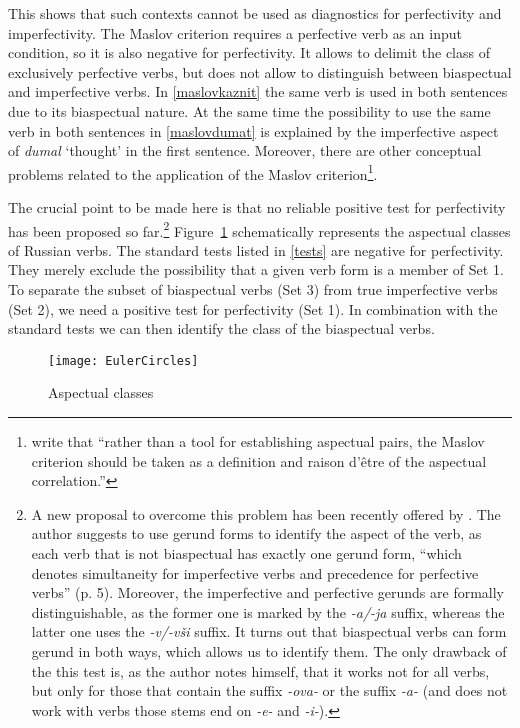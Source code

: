 This shows that such contexts cannot be used as diagnostics for perfectivity and imperfectivity. The Maslov criterion requires a perfective verb as an input condition, so it is also negative for perfectivity. It allows to delimit the class of exclusively perfective verbs, but does not allow to distinguish between biaspectual and imperfective verbs. In \ref{maslovkaznit} the same verb is used in both sentences due to its biaspectual nature. At the same time the possibility to use the same verb in both sentences in \ref{maslovdumat} is explained by the imperfective aspect of \textit{dumal} `thought' in the first sentence. Moreover, there are other conceptual problems related to the application of the Maslov criterion\footnote{\citet[2]{Mikaelian:07} write that ``rather than a tool for establishing aspectual pairs, the Maslov criterion should be taken as a definition and raison d'\^etre of the aspectual correlation.''}.

The crucial point to be made here is that no reliable positive test for perfectivity has been proposed so far.\footnote{A new proposal to overcome this problem has been recently offered by \citet{Piperski:biasp}. The author suggests to use gerund forms to identify the aspect of the verb, as each verb that is not biaspectual has exactly one gerund form, ``which denotes simultaneity for imperfective verbs and precedence for perfective verbs'' (p. 5). Moreover, the imperfective  and perfective gerunds are formally distinguishable, as the former one is marked by the \textit{-a/-ja} suffix, whereas the latter one uses the \textit{-v/-v\v{s}i} suffix. It turns out that biaspectual verbs can form gerund in both ways, which allows us to identify them. The only drawback of the this test is, as the author notes himself, that it works not for all verbs, but only for those that contain the suffix \textit{-ova-} or the suffix \textit{-a-} (and does not work with verbs those stems end on \textit{-e-} and \textit{-i-}).} Figure~\ref{circles} schematically represents the aspectual classes of Russian verbs. The standard tests listed in \ref{tests} are negative for perfectivity. They merely exclude the possibility that a given verb form is a member of Set 1. To separate the subset of biaspectual verbs (Set 3) from true imperfective verbs (Set 2), we need a positive test for perfectivity (Set 1). In combination with the standard tests we can then identify the class of the biaspectual verbs.
\begin{figure}
\begin{center}
\texttt{[image: EulerCircles]}
\caption{\label{circles}Aspectual classes}
\end{center}
\end{figure}

